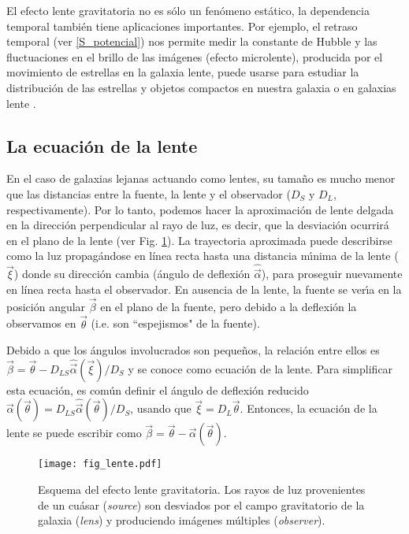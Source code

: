 \documentclass[baaa]{baaa}
\begin{document}
El efecto lente gravitatoria no es s\'olo un fen\'omeno est\'atico, la dependencia temporal tambi\'en tiene aplicaciones importantes. Por ejemplo, el retraso temporal (ver \ref{S_potencial}) nos permite medir la constante de Hubble \citep{refsdal1964} y las fluctuaciones en el brillo de las im\'agenes (efecto microlente), producida por el movimiento de estrellas en la galaxia lente, puede usarse para estudiar la distribución de las estrellas y objetos compactos en nuestra galaxia \citep{paczynski1986} o en galaxias lente \citep{chang1979}.


\subsection{La ecuaci\'on de la lente}

En el caso de galaxias lejanas actuando como lentes, su tama\~no es mucho menor que las distancias entre la fuente, la lente y el observador ($D_S$ y $D_L$, respectivamente). Por lo tanto, podemos hacer la aproximaci\'on de lente delgada en la dirección perpendicular al rayo de luz, es decir, que la desviaci\'on ocurrir\'a en el plano de la lente (ver Fig. \ref{fig1}).  
La trayectoria aproximada puede describirse como la luz propagándose en línea recta hasta una distancia m\'{\i}nima de la lente ($\vec{\xi}$) donde su dirección cambia (\'angulo de deflexi\'on $\hat{\vec{\alpha}}$), para proseguir nuevamente en línea recta hasta el observador. 
En ausencia de la lente, la fuente se ver\'{\i}a en la posición angular $\vec{\beta}$ en el plano de la fuente, pero debido a la deflexi\'on la observamos en $\vec{\theta}$ (i.e. son ``espejismos" de la fuente). 

Debido a que los ángulos involucrados son pequeños, la relación entre ellos es $\vec{\beta}=\vec{\theta}-D_{LS} \hat{\vec{\alpha}}(\vec{\xi})/D_S$ y se conoce como ecuaci\'on de la lente. Para simplificar esta ecuaci\'on, es común definir el \'angulo de deflexi\'on reducido $\vec{\alpha}(\vec{\theta})=D_{LS} \hat{\vec{\alpha}}(\vec{\theta})/D_S$,   usando que $\vec{\xi}=D_L \vec{\theta}$.  Entonces, la ecuaci\'on de la lente se puede escribir como $\vec{\beta}=\vec{\theta}-\vec{\alpha}(\vec{\theta})$. 

\begin{figure}[!t]
	\centering
	\texttt{[image: fig\_lente.pdf]}
	\caption{Esquema del efecto lente gravitatoria. Los rayos de  luz provenientes de un cuásar ({\em source}) son desviados por el campo gravitatorio de la galaxia ({\em lens}) y produciendo imágenes múltiples ({\em observer}).  
	}
	\label{fig1}
\end{figure}
\end{document}
